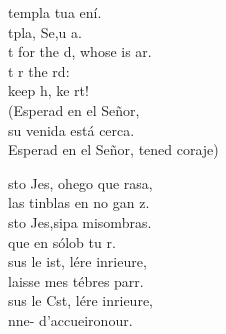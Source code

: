 \documentclass[12pt]{article}
\begin{document}
\begin{multicols*}{2}
\begin{cancion}%
	templa tua ení. \\
	tpla, Se,u a. \\
	t for the d, whose is ar. \\
	t r the rd: \\
	keep h, ke rt!\\
(Esperad en el Señor, \\
 su venida está cerca. \\
 Esperad en el Señor, tened coraje)\\
\end{cancion}%

\begin{cancion}%
	sto Jes, ohego que rasa,\\
	 las tinblas en  no gan z. \\
	sto Jes,sipa misombras. \\
	que en sólob tu r. \\
	sus le ist, lére inrieure, \\
	laisse  mes tébres parr.  \\
	sus le Cst, lére inrieure, \\
	nne- d’accueironour.\\
\end{cancion}%


\end{multicols*}
\end{document}
